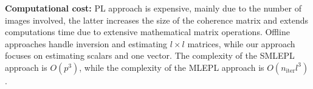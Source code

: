         \noindent
        \textbf{Computational cost:} \ac{PL} approach is expensive, mainly due to the number of images involved, the latter increases the size of the coherence matrix and extends computations time due to extensive mathematical matrix operations. Offline approaches handle inversion and estimating $l\times l$ matrices, while our approach focuses on estimating scalars and one vector. The complexity of the \acs{SMLEPL} approach is $O(p^3)$, while the complexity of the \acs{MLEPL} approach is $O(n_{\text{iter}} l^3)$.%
